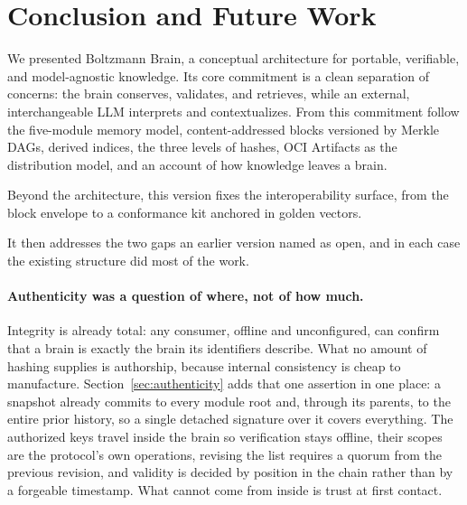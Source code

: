 \documentclass[11pt,a4paper]{article}
\begin{document}
\section{Conclusion and Future Work}
\label{sec:conclusion}

We presented Boltzmann Brain, a conceptual architecture for portable,
verifiable, and model-agnostic knowledge. Its core commitment is a clean
separation of concerns: the brain conserves, validates, and retrieves, while an
external, interchangeable LLM interprets and contextualizes. From this commitment follow the five-module memory model, content-addressed
blocks versioned by Merkle DAGs, derived indices, the three levels of hashes,
OCI Artifacts as the distribution model, and an account of how knowledge
leaves a brain.

Beyond the architecture, this version fixes the interoperability surface, from
the block envelope to a conformance kit anchored in golden vectors.

It then addresses the two gaps an earlier version named as open, and in each
case the existing structure did most of the work.

\paragraph{Authenticity was a question of where, not of how much.}
Integrity is already total: any consumer, offline and unconfigured, can
confirm that a brain is exactly the brain its identifiers describe. What no
amount of hashing supplies is authorship, because internal consistency is
cheap to manufacture. Section~\ref{sec:authenticity} adds that one assertion
in one place: a snapshot already commits to every module root and, through its
parents, to the entire prior history, so a single detached signature over it
covers everything. The authorized keys travel inside the brain so verification
stays offline, their scopes are the protocol's own operations, revising the
list requires a quorum from the previous revision, and validity is decided by
position in the chain rather than by a forgeable timestamp. What cannot come
from inside is trust at first contact.
\end{document}
